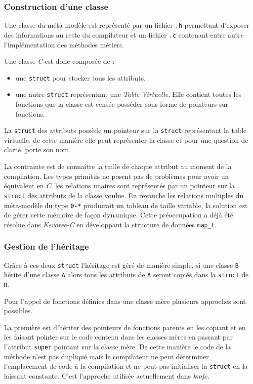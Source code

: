 \subsubsection{Construction d'une classe}

Une classe du méta-modèle est représenté par un fichier \texttt{.h} permettant d'exposer des informations au reste du compilateur et un fichier \texttt{.c} contenant entre autre l'implémentation des méthodes métiers.

Une classe \emph{C} est donc composée de :
\begin{itemize}
\item une \texttt{struct} pour stocker tous les attributs,
\item une autre \texttt{struct} représentant une \emph{Table Virtuelle}. Elle contient toutes les fonctions que la classe est censée posséder sous forme de pointeurs sur fonctions.
\end{itemize}

La \texttt{struct} des attributs possède un pointeur sur la \texttt{struct} représentant la table virtuelle, de cette manière elle peut représenter la classe et pour une question de clarté, porte son nom.

La contrainte est de connaître la taille de chaque attribut au moment de la compilation. Les types primitifs ne posent pas de problèmes pour avoir un équivalent en \emph{C}, les relations unaires sont représentés par un pointeur sur la \texttt{struct} des attributs de la classe voulue. En revanche les relations multiples du méta-modèle du type \texttt{0-*} produirait un tableau de taille variable, la solution est de gérer cette mémoire de façon dynamique. Cette préoccupation a déjà été résolue dans \emph{Kevoree-C} en développant la structure de données \texttt{map\_t}.

\subsubsection{Gestion de l'héritage}

Grâce à ces deux \texttt{struct} l'héritage est géré de manière simple, si une classe \texttt{B} hérite d'une classe \texttt{A} alors tous les attributs de \texttt{A} seront copiés dans la \texttt{struct} de \texttt{B}.

Pour l'appel de fonctions définies dans une classe mère plusieurs approches sont possibles.

La première est d'hériter des pointeurs de fonctions parents en les copiant et en les faisant pointer sur le code contenu dans les classes mères en passant par l'attribut \texttt{super} pointant sur la classe mère. De cette manière le code de la méthode n'est pas dupliqué mais le compilateur ne peut déterminer l'emplacement de code à la compilation et ne peut pas initialiser la \texttt{struct} en la laissant constante. C'est l'approche utilisée actuellement dans \emph{kmfc}.

